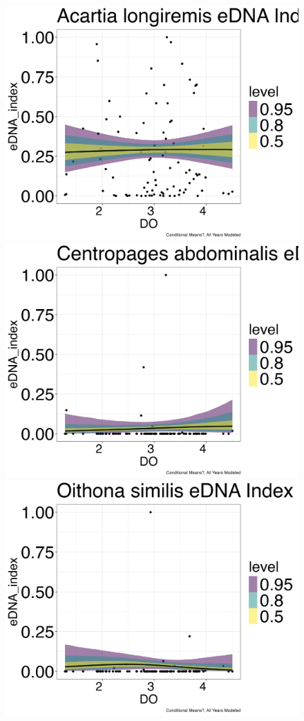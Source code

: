 \documentclass[12pt,twoside]{reedthesis}
\begin{document}
{	\begin{figure}[h]
		\begin{center}
			\includegraphics[scale=0.25]{Alongiremis_ZOIB_Means_Mod_noOut}
			\includegraphics[scale=0.25]{Cabdominalis_ZOIB_Means_Mod_noOut}
			\includegraphics[scale=0.25]{Osimilis_ZOIB_Means_Mod_noOut}

\end{center}
\end{figure}}
\end{document}
